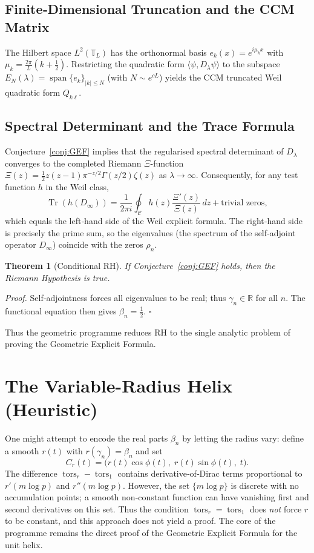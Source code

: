 \documentclass[12pt,a4paper,oneside]{book}
\newtheorem{theorem}{Theorem}[chapter]
\newcommand{\R}{\mathbb{R}}
\newcommand{\tors}{\operatorname{tors}}
\begin{document}
\subsection{Finite‑Dimensional Truncation and the CCM Matrix}
The Hilbert space \(L^2(\mathbb{T}_L)\) has the orthonormal basis \(e_k(x)=e^{i\mu_k x}\) with \(\mu_k = \frac{2\pi}{L}(k+\frac12)\).  Restricting the quadratic form \(\langle\psi,D_\lambda\psi\rangle\) to the subspace \(E_N(\lambda)=\operatorname{span}\{e_k\}_{|k|\le N}\) (with \(N\sim e^{cL}\)) yields the CCM truncated Weil quadratic form \(Q_{k\ell}\).

\subsection{Spectral Determinant and the Trace Formula}
Conjecture~\ref{conj:GEF} implies that the regularised spectral determinant of \(D_\lambda\) converges to the completed Riemann \(\Xi\)-function \(\Xi(z) = \frac12 z(z-1)\pi^{-z/2}\Gamma(z/2)\zeta(z)\) as \(\lambda\to\infty\).  Consequently, for any test function \(h\) in the Weil class,
\[
\operatorname{Tr}(h(D_\infty)) = \frac{1}{2\pi i} \oint_{\mathcal{C}} h(z) \frac{\Xi'(z)}{\Xi(z)}\,dz + \text{trivial zeros},
\]
which equals the left‑hand side of the Weil explicit formula.  The right‑hand side is precisely the prime sum, so the eigenvalues (the spectrum of the self‑adjoint operator \(D_\infty\)) coincide with the zeros \(\rho_n\).

\begin{theorem}[Conditional RH]\label{thm:condRH}
If Conjecture~\ref{conj:GEF} holds, then the Riemann Hypothesis is true.
\end{theorem}
\noindent\textit{Proof.}  Self‑adjointness forces all eigenvalues to be real; thus \(\gamma_n\in\R\) for all \(n\).  The functional equation then gives \(\beta_n = \frac12\). \(\square\)

Thus the geometric programme reduces RH to the single analytic problem of proving the Geometric Explicit Formula.

\section{The Variable-Radius Helix (Heuristic)}
One might attempt to encode the real parts \(\beta_n\) by letting the radius vary: define a smooth \(r(t)\) with \(r(\gamma_n)=\beta_n\) and set
\[
C_r(t) = \bigl( r(t)\cos\phi(t),\; r(t)\sin\phi(t),\; t \bigr).
\]
The difference \(\tors_r - \tors_1\) contains derivative‑of‑Dirac terms proportional to \(r'(m\log p)\) and \(r''(m\log p)\).  However, the set \(\{m\log p\}\) is discrete with no accumulation points; a smooth non‑constant function can have vanishing first and second derivatives on this set.  Thus the condition \(\tors_r = \tors_1\) does \emph{not} force \(r\) to be constant, and this approach does not yield a proof.  The core of the programme remains the direct proof of the Geometric Explicit Formula for the unit helix.
\end{document}
